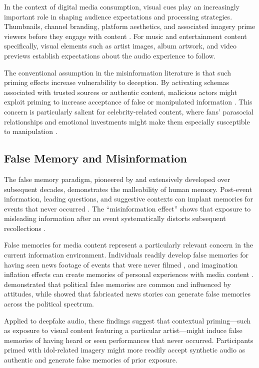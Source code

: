 \documentclass[12pt, a4paper]{article}
\begin{document}
In the context of digital media consumption, visual cues play an increasingly important role in shaping audience expectations and processing strategies. Thumbnails, channel branding, platform aesthetics, and associated imagery prime viewers before they engage with content \citep{boczkowski2017incidental}. For music and entertainment content specifically, visual elements such as artist images, album artwork, and video previews establish expectations about the audio experience to follow.

The conventional assumption in the misinformation literature is that such priming effects increase vulnerability to deception. By activating schemas associated with trusted sources or authentic content, malicious actors might exploit priming to increase acceptance of false or manipulated information \citep{pennycook2021psychology}. This concern is particularly salient for celebrity-related content, where fans' parasocial relationships and emotional investments might make them especially susceptible to manipulation \citep{horton1956mass, click2013fandom}.

\subsection{False Memory and Misinformation}

The false memory paradigm, pioneered by \citet{loftus1974reconstruction} and extensively developed over subsequent decades, demonstrates the malleability of human memory. Post-event information, leading questions, and suggestive contexts can implant memories for events that never occurred \citep{loftus2005planting}. The ``misinformation effect'' shows that exposure to misleading information after an event systematically distorts subsequent recollections \citep{loftus1978semantic}.

False memories for media content represent a particularly relevant concern in the current information environment. Individuals readily develop false memories for having seen news footage of events that were never filmed \citep{crombag1996crashing, ost2008false}, and imagination inflation effects can create memories of personal experiences with media content \citep{garry1996imagination}. \citet{frenda2013false} demonstrated that political false memories are common and influenced by attitudes, while \citet{murphy2019false} showed that fabricated news stories can generate false memories across the political spectrum.

Applied to deepfake audio, these findings suggest that contextual priming---such as exposure to visual content featuring a particular artist---might induce false memories of having heard or seen performances that never occurred. Participants primed with idol-related imagery might more readily accept synthetic audio as authentic and generate false memories of prior exposure.
\end{document}
